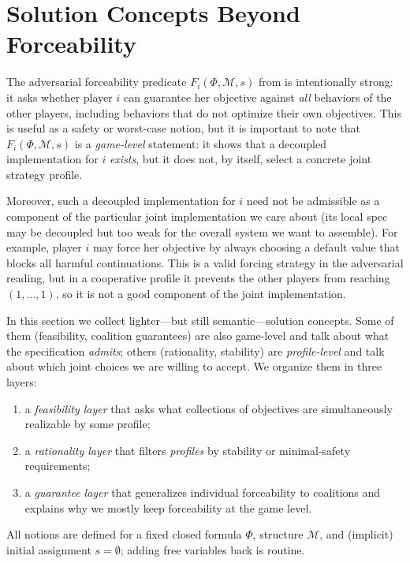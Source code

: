 \section{Solution Concepts Beyond Forceability}
\label{sec:solutions}

The adversarial forceability predicate $F_i(\Phi,\mathcal M,s)$ from
 is intentionally strong: it asks whether player $i$ can
guarantee her objective against \emph{all} behaviors of the other players,
including behaviors that do not optimize their own objectives. This is useful
as a safety or worst-case notion, but it is important to note that
$F_i(\Phi,\mathcal M,s)$ is a \emph{game-level} statement: it shows that a
decoupled implementation for $i$ \emph{exists}, but it does not, by itself,
select a concrete joint strategy profile.

Moreover, such a decoupled
implementation for $i$ need not be admissible as a component of the particular
joint implementation we care about (its local spec may be decoupled but too
weak for the overall system we want to assemble). For example, player $i$ may force her objective by always choosing a default
value that blocks all harmful continuations. This is a valid forcing strategy
in the adversarial reading, but in a cooperative profile it prevents the other
players from reaching $(1,\dots,1)$, so it is not a good component of the joint
implementation.

In this section we collect lighter---but still semantic---solution concepts.
Some of them (feasibility, coalition guarantees) are also game-level and talk
about what the specification \emph{admits}; others (rationality, stability) are
\emph{profile-level} and talk about which joint choices we are willing to
accept. We organize them in three layers:
\begin{enumerate}
  \item a \emph{feasibility layer} that asks what collections of objectives are
    simultaneously realizable by some profile;
  \item a \emph{rationality layer} that filters \emph{profiles} by stability or
    minimal-safety requirements;
  \item a \emph{guarantee layer} that generalizes individual forceability to
    coalitions and explains why we mostly keep forceability at the game level.
\end{enumerate}
All notions are defined for a fixed closed formula $\Phi$, structure
$\mathcal M$, and (implicit) initial assignment $s=\emptyset$; adding free
variables back is routine.

